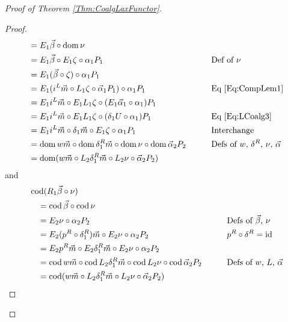 \begin{proof}[Proof of Theorem \ref{Thm:CoalgLaxFunctor}]
\begin{proof}
\begin{alignat*}{2}
			&= E_1\vec{\beta} \circ \operatorname{dom}\nu && \\
			&= E_1\vec{\beta} \circ E_1\zeta \circ \alpha_1P_1
				&& \text{Def of $\nu$} \\
			&= E_1(\vec{\beta}\circ\zeta) \circ \alpha_1P_1 && \\
			&= E_1(i^L\vec{m} \circ L_1\zeta \circ \vec{\alpha}_1P_1) \circ \alpha_1P_1
				&& \text{Eq \eqref{Eq:CompLem1}} \\
			&= E_1i^L\vec{m} \circ E_1L_1\zeta \circ (E_1\vec{\alpha}_1\circ\alpha_1)P_1 && \\
			&= E_1i^L\vec{m} \circ E_1L_1\zeta \circ (\delta_1U\circ\alpha_1)P_1
				&& \text{Eq \eqref{Eq:LCoalg3}} \\
			&= E_1i^L\vec{m} \circ \delta_1\vec{m} \circ E_1\zeta \circ \alpha_1P_1
				&& \text{Interchange} \\
			&= \operatorname{dom} w\vec{m} \circ \operatorname{dom}\delta_1^R\vec{m} \circ \operatorname{dom}\nu \circ \operatorname{dom}\vec{\alpha}_2P_2
				&\qquad& \text{Defs of $w$, $\delta^R$, $\nu$, $\vec{\alpha}$} \\
			&= \operatorname{dom} (w\vec{m} \circ L_2\delta_1^R\vec{m} \circ L_2\nu \circ \vec{\alpha}_2P_2)
		\end{alignat*}
		and
		\begin{alignat*}{2}
			\hspace{1em}&\hspace{-1em} \operatorname{cod}(R_1\vec{\beta} \circ \nu) && \\
			&= \operatorname{cod}\vec{\beta} \circ \operatorname{cod}\nu && \\
			&= E_2\nu \circ \alpha_2P_2
				&& \text{Defs of $\vec{\beta}$, $\nu$} \\
			&= E_2(p^R\circ\delta_1^R)\vec{m} \circ E_2\nu \circ \alpha_2P_2
				&& p^R\circ\delta^R = \operatorname{id} \\
			&= E_2p^R\vec{m} \circ E_2\delta_1^R\vec{m} \circ E_2\nu \circ \alpha_2P_2 && \\
			&= \operatorname{cod} w\vec{m} \circ \operatorname{cod} L_2\delta_1^R\vec{m} \circ \operatorname{cod} L_2\nu \circ \operatorname{cod}\vec{\alpha}_2P_2
				&\qquad& \text{Defs of $w$, $L$, $\vec{\alpha}$} \\
			&= \operatorname{cod}(w\vec{m} \circ L_2\delta_1^R\vec{m} \circ L_2\nu \circ \vec{\alpha}_2P_2)
		\end{alignat*}
	\end{proof}


\end{proof}
